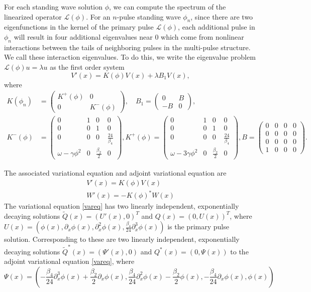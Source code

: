 \documentclass[12pt]{article}
\def\calL{{\mathcal L}}
\begin{document}
For each standing wave solution $\phi$, we can compute the spectrum of the linearized operator $\calL(\phi)$. For an $n$-pulse standing wave $\phi_n$, since there are two eigenfunctions in the kernel of the primary pulse $\calL(\phi)$, each additional pulse in $\phi_n$ will result in four additional eigenvalues near 0 which come from nonlinear interactions between the tails of neighboring pulses in the multi-pulse structure. We call these interaction eigenvalues. To do this, we write the eigenvalue problem $\calL(\phi)u = \lambda u$ as the first order system
\begin{equation}\label{multieig}
V'(x) = K(\phi)V(x) + \lambda B_1 V(x),
\end{equation}
where
\begin{align*}
K(\phi_n) &= 
\begin{pmatrix}K^+(\phi) & 0 \\ 0 & K^-(\phi) \end{pmatrix}, \quad
B_1 = \begin{pmatrix}0 & B \\ -B & 0\end{pmatrix}, \\
K^-(\phi) &= \begin{pmatrix}
0 & 1 & 0 & 0 \\
0 & 0 & 1 & 0 \\
0 & 0 & 0 & \frac{24}{\beta_4} \\
\omega - \gamma \phi^2 & 0 & \frac{\beta_2}{2} & 0
\end{pmatrix},
K^+(\phi) = \begin{pmatrix}
0 & 1 & 0 & 0 \\
0 & 0 & 1 & 0 \\
0 & 0 & 0 & \frac{24}{\beta_4} \\
\omega - 3 \gamma \phi^2 & 0 & \frac{\beta_2}{2} & 0
\end{pmatrix},
B = \begin{pmatrix}
0 & 0 & 0 & 0 \\
0 & 0 & 0 & 0 \\
0 & 0 & 0 & 0 \\
1 & 0 & 0 & 0
\end{pmatrix}.
\end{align*}

The associated variational equation and adjoint variational equation are
\begin{align}
V'(x) = K(\phi)V(x) \label{vareq} \\
W'(x) = -K(\phi)^*W(x)\label{adjvareq}
\end{align}
The variational equation \cref{vareq} has two linearly independent, exponentially decaying solutions $\tilde{Q}(x) = (U'(x), 0)^T$ and $Q(x) = (0, U(x))^T$, where $U(x) = (\phi(x), \partial_x \phi(x), \partial_x^2 \phi(x), \frac{\beta_4}{24} \partial_x^3 \phi(x))$ is the primary pulse solution. Corresponding to these are two linearly independent, exponentially decaying solutions $\tilde{Q}^*(x) = (\Psi'(x), 0)$ and $Q^*(x) = (0, \Psi(x) )$ to the adjoint variational equation \cref{vareq}, where
\[
\Psi(x) =
\left( -\frac{\beta_4}{24} \partial_x^3 \phi(x) + \frac{\beta_2}{2} \partial_x \phi(x),
\frac{\beta_4}{24} \partial_x^2 \phi(x) - \frac{\beta_2}{2} \phi(x),
- \frac{\beta_4}{24} \partial_x \phi(x), \phi(x) \right)
\]
\end{document}
